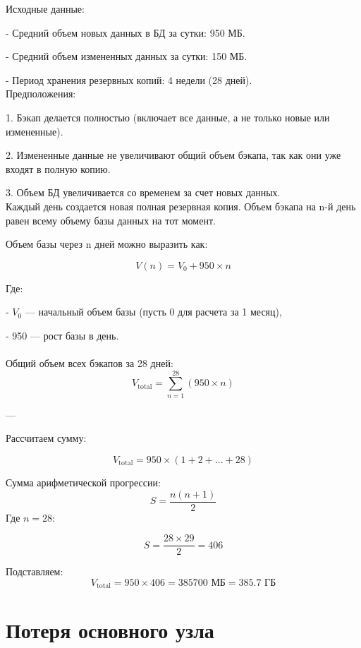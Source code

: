 \documentclass{article}
\begin{document}
Исходные данные:

- Средний объем новых данных в БД за сутки: 950 МБ.

- Средний объем измененных данных за сутки: 150 МБ.

- Период хранения резервных копий: 4 недели (28 дней).
\\
Предположения:

1. Бэкап делается полностью (включает все данные, а не только новые или измененные).

2. Измененные данные не увеличивают общий объем бэкапа, так как они уже входят в полную копию.

3. Объем БД увеличивается со временем за счет новых данных.
\\
Каждый день создается новая полная резервная копия.  
Объем бэкапа на n-й день равен всему объему базы данных на тот момент.

Объем базы через n дней можно выразить как:

\[
V(n) = V_0 + 950 \times n
\]

Где:

- \( V_0 \) — начальный объем базы (пусть 0 для расчета за 1 месяц),

- 950 — рост базы в день.
\\ \\
Общий объем всех бэкапов за 28 дней:
\[
V_{\text{total}} = \sum_{n=1}^{28} (950 \times n)
\]

---

Рассчитаем сумму:

\[
V_{\text{total}} = 950 \times (1 + 2 + ... + 28)
\]

Сумма арифметической прогрессии:
\[
S = \frac{n (n+1)}{2}
\]
Где \( n = 28 \):

\[
S = \frac{28 \times 29}{2} = 406
\]

Подставляем:
\[
V_{\text{total}} = 950 \times 406 = 385 700 \text{ МБ} = 385.7 \text{ ГБ}
\]

\section*{Потеря основного узла}
\end{document}
